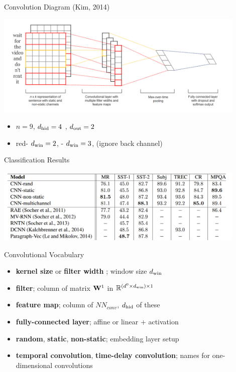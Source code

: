 \documentclass{beamer}
\begin{document}
\begin{frame}{Convolution Diagram (Kim, 2014)}
  \begin{center}
    \includegraphics[width=12cm]{kimdiagram}
  \end{center}
  \begin{itemize}
  \item $n = 9$, ${d_{\mathrm{hid}}}=4$ , ${d_{\mathrm{out}}}=2$  
    \air 
  \item \alert{red}- ${d_{\mathrm{win}}} =2$, - ${d_{\mathrm{win}}} =3$, (ignore back channel) 
    \air 

  \end{itemize}
\end{frame}

\begin{frame}{Classification Results}

  \begin{center}
    \includegraphics[width=12cm]{kimres}
  \end{center}
\end{frame}

\begin{frame}{Convolutional Vocabulary}
  \begin{itemize}
  \item \textbf{kernel size} or \textbf{filter width} ; window size ${d_{\mathrm{win}}}$
    \air 
  \item \textbf{filter}; column of matrix  $\mathbf{W}^1$ in $\mathbb{R}^{(d^0\times {d_{\mathrm{win}}})  \times 1}$  
    \air 

  \item \textbf{feature map}; column of $NN_{conv}$, ${d_{\mathrm{hid}}}$ of these 
    \air 

  \item \textbf{fully-connected layer}; affine or linear  + activation  
    \air 

  \item \textbf{random}, \textbf{static}, \textbf{non-static}; embedding layer setup
    \air
  \item \textbf{temporal convolution}, \textbf{time-delay convolution}; names for one-dimensional convolutions
  \end{itemize}
\end{frame}
\end{document}
